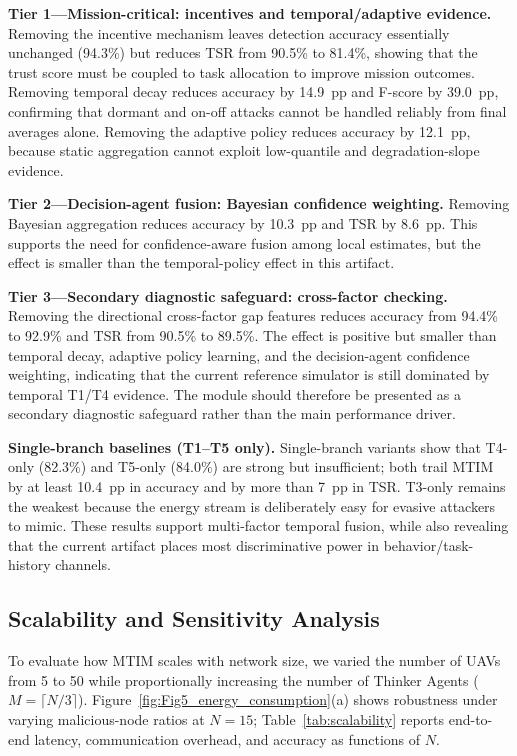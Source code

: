 \documentclass[notspecified,article,submit,moreauthors]{Definitions/mdpi}
\begin{document}
\textbf{Tier 1---Mission-critical: incentives and temporal/adaptive evidence.}
Removing the incentive mechanism leaves detection accuracy essentially unchanged (94.3\%) but reduces TSR from 90.5\% to 81.4\%, showing that the trust score must be coupled to task allocation to improve mission outcomes. Removing temporal decay reduces accuracy by 14.9~pp and F-score by 39.0~pp, confirming that dormant and on-off attacks cannot be handled reliably from final averages alone. Removing the adaptive policy reduces accuracy by 12.1~pp, because static aggregation cannot exploit low-quantile and degradation-slope evidence.

\textbf{Tier 2---Decision-agent fusion: Bayesian confidence weighting.}
Removing Bayesian aggregation reduces accuracy by 10.3~pp and TSR by 8.6~pp. This supports the need for confidence-aware fusion among local estimates, but the effect is smaller than the temporal-policy effect in this artifact.

\textbf{Tier 3---Secondary diagnostic safeguard: cross-factor checking.}
Removing the directional cross-factor gap features reduces accuracy from 94.4\% to 92.9\% and TSR from 90.5\% to 89.5\%. The effect is positive but smaller than temporal decay, adaptive policy learning, and the decision-agent confidence weighting, indicating that the current reference simulator is still dominated by temporal T1/T4 evidence. The module should therefore be presented as a secondary diagnostic safeguard rather than the main performance driver.

\textbf{Single-branch baselines (T1--T5 only).}
Single-branch variants show that T4-only (82.3\%) and T5-only (84.0\%) are strong but insufficient; both trail MTIM by at least 10.4~pp in accuracy and by more than 7~pp in TSR. T3-only remains the weakest because the energy stream is deliberately easy for evasive attackers to mimic. These results support multi-factor temporal fusion, while also revealing that the current artifact places most discriminative power in behavior/task-history channels.

\subsection{Scalability and Sensitivity Analysis}
\label{sec:scalability}
To evaluate how MTIM scales with network size, we varied the number of UAVs from 5 to 50 while proportionally increasing the number of Thinker Agents ($M = \lceil N/3 \rceil$). Figure~\ref{fig:Fig5_energy_consumption}(a) shows robustness under varying malicious-node ratios at $N=15$; Table~\ref{tab:scalability} reports end-to-end latency, communication overhead, and accuracy as functions of $N$.
\end{document}
